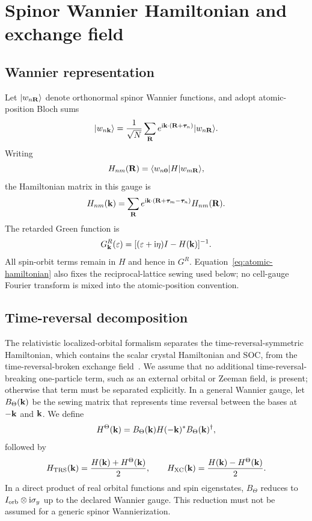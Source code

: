 \section{Spinor Wannier Hamiltonian and exchange field}
\label{sec:spinor-model}

\subsection{Wannier representation}

Let $|w_{n\mathbf R}\rangle$ denote orthonormal spinor Wannier functions, and adopt atomic-position Bloch sums
\begin{equation}
|w_{n\mathbf k}\rangle
=\frac{1}{\sqrt N}\sum_{\mathbf R}
 e^{\mathrm{i}\mathbf k\cdot(\mathbf R+\bm\tau_n)}|w_{n\mathbf R}\rangle.
\label{eq:atomic-bloch}
\end{equation}
Writing
\begin{equation}
H_{nm}(\mathbf R)=\langle w_{n\mathbf 0}|H|w_{m\mathbf R}\rangle,
\end{equation}
the Hamiltonian matrix in this gauge is
\begin{equation}
H_{nm}(\mathbf k)=\sum_{\mathbf R}
 e^{\mathrm{i}\mathbf k\cdot(\mathbf R+\bm\tau_m-\bm\tau_n)}H_{nm}(\mathbf R).
\label{eq:atomic-hamiltonian}
\end{equation}
The retarded Green function is
\begin{equation}
G^R_{\mathbf k}(\varepsilon)=[(\varepsilon+\mathrm{i}\eta)I-H(\mathbf k)]^{-1}.
\label{eq:green}
\end{equation}
All spin-orbit terms remain in $H$ and hence in $G^R$. Equation~\eqref{eq:atomic-hamiltonian} also fixes the reciprocal-lattice sewing used below; no cell-gauge Fourier transform is mixed into the atomic-position convention.

\subsection{Time-reversal decomposition}

The relativistic localized-orbital formalism separates the time-reversal-symmetric Hamiltonian, which contains the scalar crystal Hamiltonian and SOC, from the time-reversal-broken exchange field~\cite{MartinezCarracedo2023}. We assume that no additional time-reversal-breaking one-particle term, such as an external orbital or Zeeman field, is present; otherwise that term must be separated explicitly. In a general Wannier gauge, let $B_\Theta(\mathbf k)$ be the sewing matrix that represents time reversal between the bases at $-\mathbf k$ and $\mathbf k$. We define
\begin{equation}
H^\Theta(\mathbf k)
=B_\Theta(\mathbf k)H(-\mathbf k)^*B_\Theta(\mathbf k)^\dagger,
\label{eq:tr-transform}
\end{equation}
followed by
\begin{equation}
H_{\mathrm{TRS}}(\mathbf k)=\frac{H(\mathbf k)+H^\Theta(\mathbf k)}{2},
\qquad
H_{\mathrm{XC}}(\mathbf k)=\frac{H(\mathbf k)-H^\Theta(\mathbf k)}{2}.
\label{eq:tr-split}
\end{equation}
In a direct product of real orbital functions and spin eigenstates, $B_\Theta$ reduces to $I_{\rm orb}\otimes \mathrm{i}\sigma_y$ up to the declared Wannier gauge. This reduction must not be assumed for a generic spinor Wannierization.


